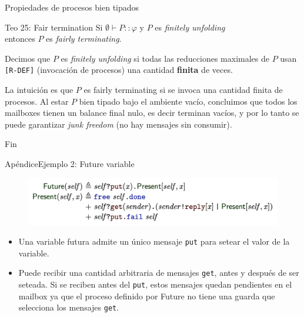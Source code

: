 \documentclass{beamer}
\newcommand{\msgtag}[1]{\texttt{\textcolor{msg-color}{#1}}}
\begin{document}
\begin{frame}{Propiedades de procesos bien tipados}
    \begin{block}{Teo 25: Fair termination}
        Si $\emptyset \vdash P :: \varphi$ y $P$ es \emph{finitely unfolding}
        \\ entonces $P$ es \emph{fairly terminating}.
    \end{block}
    \vspace{1em}

    Decimos que $P$ es \emph{finitely unfolding} si todas las reducciones maximales de $P$ usan \texttt{[R-DEF]} (invocación de procesos) una cantidad \textbf{finita} de veces.
    \vspace{1em}

    La intuición es que $P$ es fairly terminating si se invoca una cantidad finita de procesos. Al estar $P$ bien tipado bajo el ambiente vacío, concluimos que todos los mailboxes tienen un balance final nulo, es decir terminan vacíos, y por lo tanto se puede garantizar \emph{junk freedom} (no hay mensajes sin consumir).
\end{frame}

\begin{frame}{Fin}
    \centering
    
\end{frame}

\begin{frame}{Apéndice}{Ejemplo 2: Future variable}
    \begin{figure}[H]
        \includegraphics[width=\textwidth]{example2-future}
    \end{figure}

    \begin{itemize}
        \item Una variable futura admite un único mensaje \msgtag{put} para setear el valor de la variable.
        \item Puede recibir una cantidad arbitraria de mensajes \msgtag{get}, antes y después de ser seteada. Si se reciben antes del \msgtag{put}, estos mensajes quedan pendientes en el mailbox ya que el proceso definido por Future no tiene una guarda que selecciona los mensajes \msgtag{get}.
    \end{itemize}
\end{frame}
\end{document}
